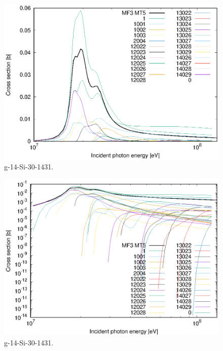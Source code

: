 \begin{figure}
 \includegraphics[width=\linewidth]{eps/g_14-Si-30_1431.eps}
  \caption{g-14-Si-30-1431.}
\end{figure}
\begin{figure}
 \includegraphics[width=\linewidth]{eps-log/g_14-Si-30_1431.eps}
 \caption{g-14-Si-30-1431.}
\end{figure}
\newpage \clearpage

